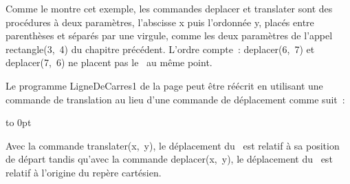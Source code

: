 \noindent Comme le montre cet exemple, les commandes {\idt deplacer} et {\idt translater}
sont des procédures à deux paramètres, l'abscisse {\idt x} puis l'ordonnée {\idt y},
placés entre parenthèses et séparés par une virgule, comme les deux paramètres
de l'appel {\idt rectangle(3,\ 4)} du chapitre précédent. L'ordre compte~:
{\idt deplacer(6,\ 7)} et {\idt deplacer(7,\ 6)} ne placent pas le \robot\ au même point.


Le programme {\idt LigneDeCarres1} de la page
\pageref{prog:LigneDeCarres1} peut être réécrit en uti\-li\-sant une
commande de translation au lieu d'une commande de dé\-pla\-ce\-ment
com\-me suit~:\\
{\raggedright%
\vspace{\baselineskip}%
\vbox to 0pt{\vspace*{\baselineskip}\vspace*{6cm}%
}%
\vspace*{-1cm}%

\vspace{0.5cm}%
}
 
 Avec la commande {\idt translater(x,\ y)}, le déplacement du \robot\ est relatif à sa position de
départ tandis qu'avec la commande {\idt deplacer(x,\ y)}, le déplacement du \robot\ est relatif 
à l'origine du repère cartésien.
 
